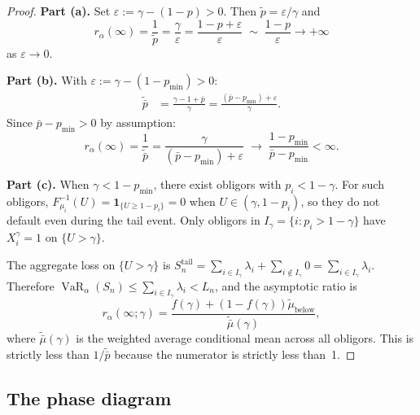 \documentclass[11pt]{article}
\theoremstyle{definition}
\newcommand{\VaR}{\operatorname{VaR}}
\newcommand{\1}{\mathbf{1}}
\begin{document}
\begin{proof}
\textbf{Part (a).} Set $\varepsilon := \gamma - (1-p) > 0$. Then $\tilde{p} = \varepsilon/\gamma$ and
\[
  r_\alpha(\infty) = \frac{1}{\tilde{p}} = \frac{\gamma}{\varepsilon} = \frac{1-p+\varepsilon}{\varepsilon} \;\sim\; \frac{1-p}{\varepsilon} \to +\infty
\]
as $\varepsilon \to 0$.

\textbf{Part (b).} With $\varepsilon := \gamma - (1-p_{\min}) > 0$:
\begin{align*}
  \tilde{\bar{p}} &= \frac{\gamma - 1 + \bar{p}}{\gamma} = \frac{(\bar{p} - p_{\min}) + \varepsilon}{\gamma}.
\end{align*}
Since $\bar{p} - p_{\min} > 0$ by assumption:
\[
  r_\alpha(\infty) = \frac{1}{\tilde{\bar{p}}} = \frac{\gamma}{(\bar{p} - p_{\min}) + \varepsilon} \;\to\; \frac{1 - p_{\min}}{\bar{p} - p_{\min}} < \infty.
\]

\textbf{Part (c).} When $\gamma < 1 - p_{\min}$, there exist obligors with $p_i < 1 - \gamma$. For such obligors, $F_{\mu_i}^{-1}(U) = \1_{\{U \geq 1-p_i\}} = 0$ when $U \in (\gamma, 1-p_i)$, so they do not default even during the tail event. Only obligors in $I_\gamma = \{i : p_i > 1-\gamma\}$ have $X_i^\gamma = 1$ on $\{U > \gamma\}$.

The aggregate loss on $\{U > \gamma\}$ is $S_n^{\mathrm{tail}} = \sum_{i \in I_\gamma} \lambda_i + \sum_{i \notin I_\gamma} 0 = \sum_{i \in I_\gamma} \lambda_i$. Therefore $\VaR_\alpha(S_n) \leq \sum_{i \in I_\gamma} \lambda_i < L_n$, and the asymptotic ratio is
\[
  r_\alpha(\infty; \gamma) = \frac{f(\gamma) + (1-f(\gamma))\tilde{\mu}_{\mathrm{below}}}{\tilde{\bar{\mu}}(\gamma)},
\]
where $\tilde{\bar{\mu}}(\gamma)$ is the weighted average conditional mean across all obligors. This is strictly less than $1/\tilde{\bar{p}}$ because the numerator is strictly less than~1.
\end{proof}

\subsection{The phase diagram}
\end{document}
